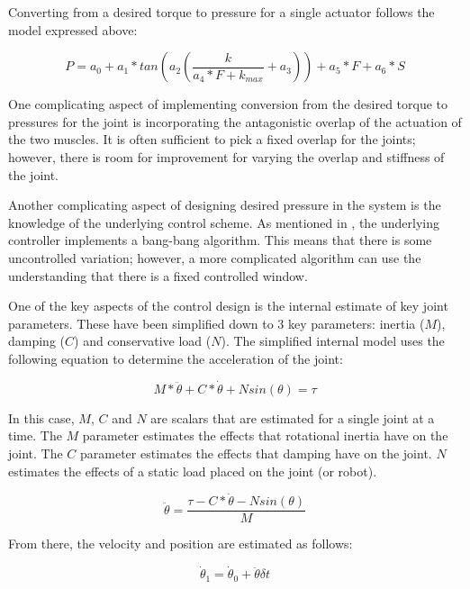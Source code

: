 Converting from a desired torque to pressure for a single actuator follows
the model expressed above:

\begin{equation}
P = a_{0} + a_{1} * tan \left(a_{2} \left(\dfrac{k}{a_{4} * F + k_{max}} + a_{3} \right) \right) + a_{5} * F + a_{6} * S
\end{equation}

One complicating aspect of implementing conversion from the desired torque to 
pressures for
the joint is incorporating the antagonistic overlap of the actuation of the two 
muscles. It is often sufficient to pick a fixed overlap for the joints; however,
there is room for improvement for varying the overlap and stiffness of the joint.

Another complicating aspect of designing desired pressure in the system is the
knowledge of the underlying control scheme. As mentioned in \cite{HuntPMuscles},
the underlying controller implements a bang-bang algorithm. This means that 
there is some uncontrolled variation; however, a more complicated algorithm
can use the understanding that there is a fixed controlled window.


One of the key aspects of the control design is the internal estimate of key 
joint parameters. These have been simplified down to 3 key parameters: inertia 
($M$), damping ($C$) and conservative load ($N$). The simplified internal 
model uses the following equation to determine the acceleration of the joint:

\begin{equation}
M * \ddot{\theta} + C * \dot{\theta} + N sin \left(\theta \right) = \tau
\end{equation}

In this case, $M$, $C$ and $N$ are scalars that are estimated for a single joint at a time. The $M$ parameter estimates the effects that rotational inertia have on the joint. The $C$ parameter estimates the effects that damping have on the joint. $N$ estimates the effects of a static load placed on the joint (or robot).

\begin{equation} \label{eq:accel}
\ddot{\theta} = \dfrac{\tau - C * \dot{\theta} - N sin \left(\theta \right)}{M}
\end{equation}

From there, the velocity and position are estimated as follows:

\begin{equation}
\dot{\theta}_{1} = \dot{\theta}_{0} + \ddot{\theta} \delta t
\end{equation}

